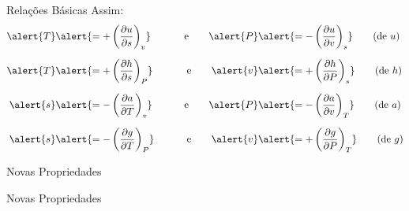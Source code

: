     \begin{frame}{Relações Básicas}\vspace*{-0em}
        Assim:
        \begin{alignat*}{2}
            \alert{T}         &\alert{=  +\left(\frac{\partial u}{\partial s}\right)_v}\qquad &
            \mbox{e}\qquad
            \alert{P}         &\alert{=  -\left(\frac{\partial u}{\partial v}\right)_s}\qquad
            \mbox{(de $u$)}   \\[\medskipamount]
            \alert{T}         &\alert{=  +\left(\frac{\partial h}{\partial s}\right)_P}\qquad &
            \mbox{e}\qquad
            \alert{v}         &\alert{=  +\left(\frac{\partial h}{\partial P}\right)_s}\qquad
            \mbox{(de $h$)}   \\[\medskipamount]
            \alert{s}         &\alert{=  -\left(\frac{\partial a}{\partial T}\right)_v}\qquad &
            \mbox{e}\qquad
            \alert{P}         &\alert{=  -\left(\frac{\partial a}{\partial v}\right)_T}\qquad
            \mbox{(de $a$)}   \\[\medskipamount]
            \alert{s}         &\alert{=  -\left(\frac{\partial g}{\partial T}\right)_P}\qquad &
            \mbox{e}\qquad
            \alert{v}         &\alert{=  +\left(\frac{\partial g}{\partial P}\right)_T}\qquad
            \mbox{(de $g$)}
        \end{alignat*}
    \end{frame}

    \begin{frame}{Novas Propriedades}\vspace*{-1em}
    \end{frame}

    \begin{frame}{Novas Propriedades}\vspace*{-1em}
    \end{frame}

